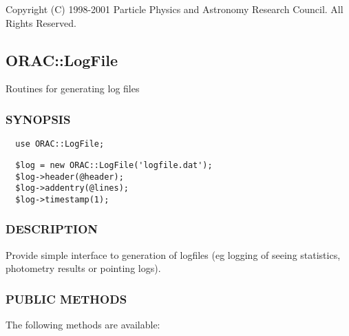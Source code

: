 Copyright (C) 1998-2001 Particle Physics and Astronomy Research
Council. All Rights Reserved.

\subsection{ORAC::LogFile\label{ORAC::LogFile}}


Routines for generating log files

\subsubsection*{SYNOPSIS\label{ORAC::LogFile_SYNOPSIS}}
\begin{verbatim}
  use ORAC::LogFile;
\end{verbatim}
\begin{verbatim}
  $log = new ORAC::LogFile('logfile.dat');
  $log->header(@header);
  $log->addentry(@lines);
  $log->timestamp(1);
\end{verbatim}
\subsubsection*{DESCRIPTION\label{ORAC::LogFile_DESCRIPTION}}


Provide simple interface to generation of logfiles (eg logging
of seeing statistics, photometry results or pointing logs).

\subsubsection*{PUBLIC METHODS\label{ORAC::LogFile_PUBLIC_METHODS}}


The following methods are available:

